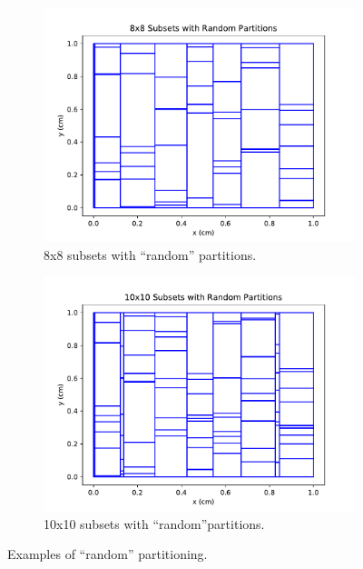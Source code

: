 \documentclass[times,final]{elsarticle}
\begin{document}
\begin{figure}[H]
\begin{subfigure}[b]{0.45\textwidth}
  \includegraphics[width=\textwidth]{../Dissertation/cut_line_files/8_random.pdf}
  \caption{8x8 subsets with ``random'' partitions.}
  \label{8random}
\end{subfigure}
\begin{subfigure}[b]{0.45\textwidth}
  \includegraphics[width=\textwidth]{../Dissertation/cut_line_files/10_random.pdf}
  \caption{10x10 subsets with ``random''partitions.}
  \label{10random}
\end{subfigure}
\caption{Examples of ``random'' partitioning.}
\label{random_partitions}
\end{figure}
\end{document}
